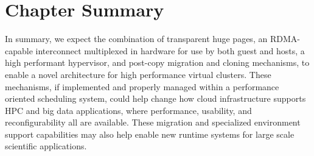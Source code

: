  

\section{Chapter Summary}
\label{chap7sum}



In summary, we expect the combination of transparent huge pages, an RDMA-capable interconnect multiplexed in hardware for use by both guest and hosts, a high performant hypervisor, and post-copy migration and cloning mechanisms, to enable a novel architecture for high performance virtual clusters. These mechanisms, if implemented and properly managed within a performance oriented scheduling system, could help change how cloud infrastructure supports HPC and big data applications, where performance, usability, and reconfigurability all are available.  These migration and specialized environment support capabilities may also help enable new runtime systems for large scale scientific applications. 






